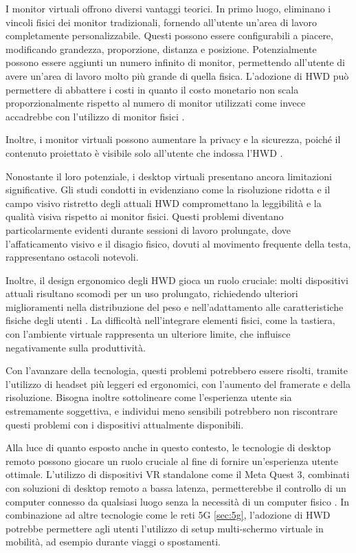 \documentclass[12pt,a4paper,openright,twoside]{book}
\begin{document}
I monitor virtuali offrono diversi vantaggi teorici. In primo luogo, eliminano i vincoli fisici dei monitor tradizionali, fornendo all'utente un'area di lavoro completamente personalizzabile. Questi possono essere configurabili a piacere, modificando grandezza, proporzione, distanza e posizione. Potenzialmente possono essere aggiunti un numero infinito di monitor, permettendo all'utente di avere un'area di lavoro molto più grande di quella fisica.
L'adozione di HWD può permettere di abbattere i costi in quanto il costo monetario non scala proporzionalmente rispetto al numero di monitor utilizzati come invece accadrebbe con l'utilizzo di monitor fisici \cite{frontiers2023}.

Inoltre, i monitor virtuali possono aumentare la privacy e la sicurezza, poiché il contenuto proiettato è visibile solo all'utente che indossa l'HWD \cite{pavanatto2021}.

Nonostante il loro potenziale, i desktop virtuali presentano ancora limitazioni significative. Gli studi condotti in \cite{pavanatto2021, frontiers2023} evidenziano come la risoluzione ridotta e il campo visivo ristretto degli attuali HWD compromettano la leggibilità e la qualità visiva rispetto ai monitor fisici. Questi problemi diventano particolarmente evidenti durante sessioni di lavoro prolungate, dove l'affaticamento visivo e il disagio fisico, dovuti al movimento frequente della testa, rappresentano ostacoli notevoli.

Inoltre, il design ergonomico degli HWD gioca un ruolo cruciale: molti dispositivi attuali risultano scomodi per un uso prolungato, richiedendo ulteriori miglioramenti nella distribuzione del peso e nell'adattamento alle caratteristiche fisiche degli utenti \cite{frontiers2023}. La difficoltà nell'integrare elementi fisici, come la tastiera, con l'ambiente virtuale rappresenta un ulteriore limite, che influisce negativamente sulla produttività.

Con l'avanzare della tecnologia, questi problemi potrebbero essere risolti, tramite l'utilizzo di headset più leggeri ed ergonomici, con l'aumento del framerate e della risoluzione. Bisogna inoltre sottolineare come l'esperienza utente sia estremamente soggettiva, e individui meno sensibili potrebbero non riscontrare questi problemi con i dispositivi attualmente disponibili.

Alla luce di quanto esposto anche in questo contesto, le tecnologie di desktop remoto possono giocare un ruolo cruciale al fine di fornire un'esperienza utente ottimale. L'utilizzo di dispositivi VR standalone come il Meta Quest 3, combinati con soluzioni di desktop remoto a bassa latenza, permetterebbe il controllo di un computer connesso da qualsiasi luogo senza la necessità di un computer fisico \cite{frontiers2023}. In combinazione ad altre tecnologie come le reti 5G \ref{sec:5g}, l'adozione di HWD potrebbe permettere agli utenti l'utilizzo di setup multi-schermo virtuale in mobilità, ad esempio durante viaggi o spostamenti.
\end{document}
